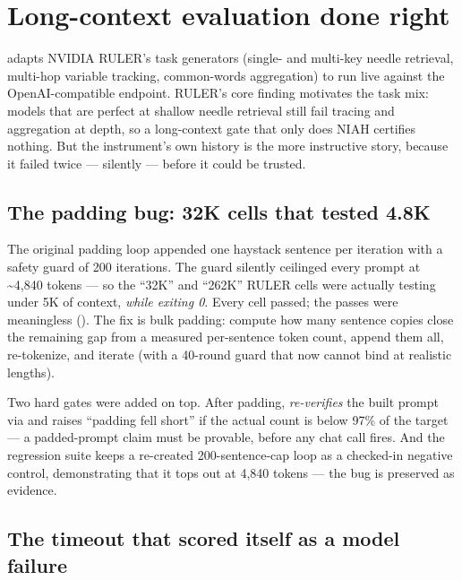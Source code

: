 \section{Long-context evaluation done right}

 adapts NVIDIA RULER's task generators
(single- and multi-key needle retrieval, multi-hop variable tracking,
common-words aggregation) to run live against the OpenAI-compatible
endpoint. RULER's core finding motivates the task mix: models that are
perfect at shallow needle retrieval still fail tracing and aggregation at
depth, so a long-context gate that only does NIAH certifies nothing. But
the instrument's own history is the more instructive story, because it
failed twice --- silently --- before it could be trusted.

\subsection{The padding bug: 32K cells that tested 4.8K}

The original padding loop appended one haystack sentence per iteration with
a safety guard of 200 iterations. The guard silently ceilinged every prompt
at \textasciitilde{}4{,}840 tokens --- so the ``32K'' and ``262K'' RULER
cells were actually testing under 5K of context, \emph{while exiting 0}.
Every cell passed; the passes were meaningless (). The fix is
bulk padding: compute how many sentence copies close the remaining gap from
a measured per-sentence token count, append them all, re-tokenize, and
iterate (with a 40-round guard that now cannot bind at realistic lengths).

Two hard gates were added on top. After padding, 
\emph{re-verifies} the built prompt via  and raises
``padding fell short'' if the actual count is below 97\% of the target ---
a padded-prompt claim must be provable, before any chat call fires. And the
regression suite  keeps a
re-created 200-sentence-cap loop as a checked-in negative control,
demonstrating that it tops out at 4{,}840 tokens --- the bug is preserved
as evidence.

\subsection{The timeout that scored itself as a model failure}

